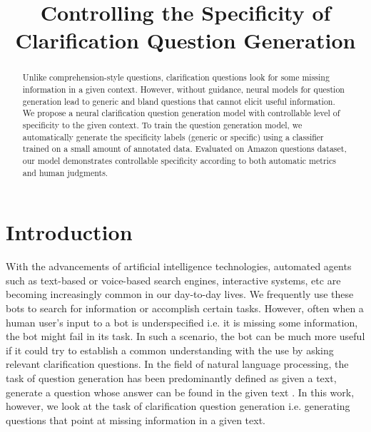 \documentclass[11pt,a4paper]{article}
\title{Controlling the Specificity of Clarification Question Generation}
\date{}
\begin{document}
\maketitle
\begin{abstract}


Unlike comprehension-style questions, clarification questions look for some missing information in a given context. 
However, without guidance, neural models for question generation lead to generic and bland questions that cannot elicit useful information. 
We propose a neural clarification question generation model with controllable level of specificity to the given context. 
To train the question generation model, we automatically generate the specificity labels (generic or specific) using a classifier trained on a small amount of annotated data. 
Evaluated on Amazon questions dataset, our model demonstrates controllable specificity according to both automatic metrics and human judgments.

\end{abstract}

\section{Introduction}

With the advancements of artificial intelligence technologies, automated agents such as text-based or voice-based search engines, interactive systems, etc are becoming increasingly common in our day-to-day lives.
We frequently use these bots to search for information or accomplish certain tasks. 
However, often when a human user's input to a bot is underspecified i.e. it is missing some information, the bot might fail in its task. 
In such a scenario, the bot can be much more useful if it could try to establish a common understanding with the use by asking relevant clarification questions.
In the field of natural language processing, the task of question generation has been predominantly defined as given a text, generate a question whose answer can be found in the given text \cite{heilman2011automatic}.
In this work, however, we look at the task of clarification question generation i.e. generating questions that point at missing information in a given text. 
\end{document}

